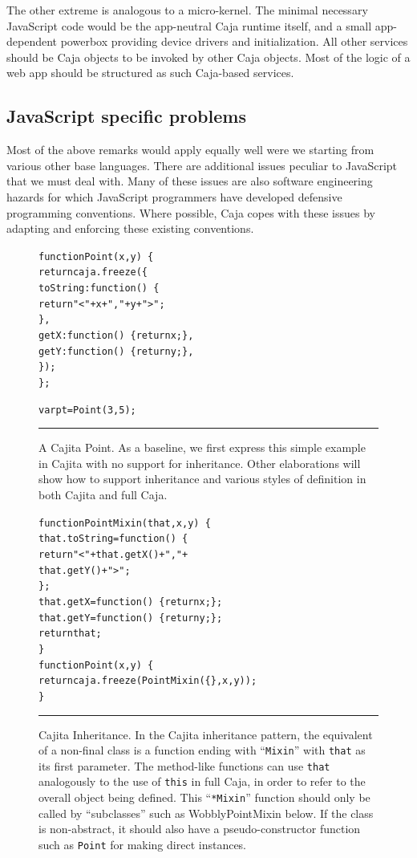 \documentclass[letterpaper,twocolumn,10pt]{article}
\newcommand{\code}[1]{{\tt {#1}}}              %
\begin{document}
The other extreme is analogous to a micro-kernel. The minimal necessary 
JavaScript code would be the app-neutral Caja runtime itself, and a small 
app-dependent powerbox providing device drivers and initialization. All other 
services should be Caja objects to be invoked by other Caja objects. Most 
of the logic of a web app should be structured as such Caja-based services.

\subsection{JavaScript specific problems}

Most of the above remarks would apply equally well were we starting from 
various other base languages. There are additional issues peculiar to 
JavaScript that we must deal with. Many of these issues are also software 
engineering hazards for which JavaScript programmers have developed 
defensive programming conventions. Where possible, Caja copes with these 
issues by adapting and enforcing these existing conventions.

\begin{figure}[t!]
\begin{alltt}
function Point(x, y)\ \{
  return caja.freeze(\{
    toString: function()\ \{ 
      return "<" + x + "," + y + ">"; 
    \},
    getX: function()\ \{ return x; \},
    getY: function()\ \{ return y; \},
  \});
\};

var pt = Point(3, 5);
\end{alltt}

\caption[A Cajita Point.]{A Cajita Point. As a baseline, we first express 
this simple example in Cajita with no support for inheritance. Other 
elaborations will show how to support inheritance and various styles of 
definition in both Cajita and full Caja. 
\\ } \hrule
\label{fig:cajita-point}
\end{figure}

\begin{figure}[t!]
\begin{alltt}
function PointMixin(that, x, y)\ \{
  that.toString = function()\ \{ 
    return "<" + that.getX() + "," + 
                 that.getY() + ">"; 
  \};
  that.getX = function()\ \{ return x; \};
  that.getY = function()\ \{ return y; \};
  return that;
\}
function Point(x, y)\ \{
  return caja.freeze(PointMixin(\{\}, x, y));
\}
\end{alltt}

\caption[Cajita Inheritance.]{Cajita Inheritance. In the Cajita inheritance 
pattern, the equivalent of a non-final class is a function ending with 
``\code{Mixin}'' with \code{that} as its first parameter. The method-like 
functions can use \code{that} analogously to the use of \code{this} in full 
Caja, in order to refer to the overall object being defined. This 
``\code{*Mixin}'' function should only be called by ``subclasses'' such as 
WobblyPointMixin below. If the class is non-abstract, it should also have a 
pseudo-constructor function such as \code{Point} for making direct 
instances. \\ } \hrule
\label{fig:cajita-super-point}
\end{figure}
\end{document}
